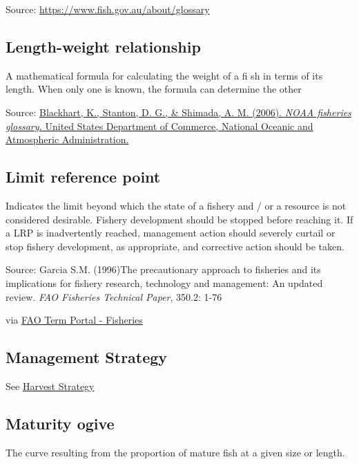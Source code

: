 \documentclass[
  11pt,
]{book}
\begin{document}
Source: \url{https://www.fish.gov.au/about/glossary}

\hypertarget{length-weight-relationship}{%
\subsection{Length-weight relationship}\label{length-weight-relationship}}

A mathematical formula for calculating the weight of a ﬁ sh in terms of its length. When only one is known, the formula can determine the other

Source: \href{https://repository.library.noaa.gov/view/noaa/12856}{Blackhart, K., Stanton, D. G., \& Shimada, A. M. (2006). \emph{NOAA fisheries glossary.} United States Department of Commerce, National Oceanic and Atmospheric Administration.}

\hypertarget{limit-reference-point}{%
\subsection{Limit reference point}\label{limit-reference-point}}

Indicates the limit beyond which the state of a fishery and / or a resource is not considered desirable. Fishery development should be stopped before reaching it. If a LRP is inadvertently reached, management action should severely curtail or stop fishery development, as appropriate, and corrective action should be taken.

Source: Garcia S.M. (1996)The precautionary approach to fisheries and its implications for fishery research, technology and management: An updated review. \emph{FAO Fisheries Technical Paper}, 350.2: 1-76

via \href{http://www.fao.org/fishery/glossary/en}{FAO Term Portal - Fisheries}

\hypertarget{management-strategy}{%
\subsection{Management Strategy}\label{management-strategy}}

See \protect\hyperlink{harvest-strategy}{Harvest Strategy}

\hypertarget{maturity-ogive}{%
\subsection{Maturity ogive}\label{maturity-ogive}}

The curve resulting from the proportion of mature fish at a given size or length.
\end{document}
